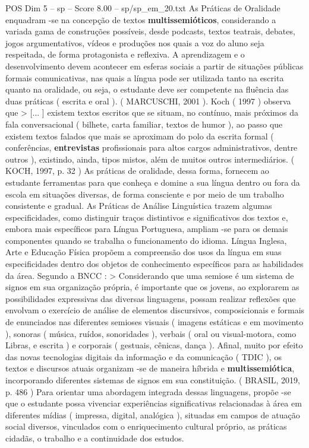 \begin{textsample}{POS Dim 5 – sp – Score 8.00 – sp/sp\_em\_20.txt}
As Práticas de Oralidade enquadram -se na concepção de textos \textbf{multissemióticos}, considerando a variada gama de construções possíveis, desde podcasts, textos teatrais, debates, jogos argumentativos, vídeos e produções nos quais a voz do aluno seja respeitada, de forma protagonista e reflexiva.
A aprendizagem e o desenvolvimento devem acontecer em esferas sociais a partir de situações públicas formais comunicativas, nas quais a língua pode ser utilizada tanto na escrita quanto na oralidade, ou seja, o estudante deve ser competente na fluência das duas práticas ( escrita e oral ). ( MARCUSCHI, 2001 ).
Koch ( 1997 ) observa que > [... ] existem textos escritos que se situam, no contínuo, mais próximos da fala conversacional ( bilhete, carta familiar, textos de humor ), ao passo que existem textos falados que mais se aproximam do polo da escrita formal ( conferências, \textbf{entrevistas} profissionais para altos cargos administrativos, dentre outros ), existindo, ainda, tipos mistos, além de muitos outros intermediários. ( KOCH, 1997, p. 32 ) As práticas de oralidade, dessa forma, fornecem ao estudante ferramentas para que conheça e domine a sua língua dentro ou fora da escola em situações diversas, de forma consciente e por meio de um trabalho consistente e gradual.
As Práticas de Análise Linguística trazem algumas especificidades, como distinguir traços distintivos e significativos dos textos e, embora mais específicos para Língua Portuguesa, ampliam -se para os demais componentes quando se trabalha o funcionamento do idioma.
Língua Inglesa, Arte e Educação Física propõem a compreensão dos usos da língua em suas especificidades dentro dos objetos de conhecimento específicos para as habilidades da área.
Segundo a BNCC : > Considerando que uma semiose é um sistema de signos em sua organização própria, é importante que os jovens, ao explorarem as possibilidades expressivas das diversas linguagens, possam realizar reflexões que envolvam o exercício de análise de elementos discursivos, composicionais e formais de enunciados nas diferentes semioses visuais ( imagens estáticas e em movimento ), sonoras ( música, ruídos, sonoridades ), verbais ( oral ou visual-motora, como Libras, e escrita ) e corporais ( gestuais, cênicas, dança ).
Afinal, muito por efeito das novas tecnologias digitais da informação e da comunicação ( TDIC ), os textos e discursos atuais organizam -se de maneira híbrida e \textbf{multissemiótica}, incorporando diferentes sistemas de signos em sua constituição. ( BRASIL, 2019, p. 486 ) Para orientar uma abordagem integrada dessas linguagens, propõe -se que o estudante possa vivenciar experiências significativas relacionadas à área em diferentes mídias ( impressa, digital, analógica ), situadas em campos de atuação social diversos, vinculados com o enriquecimento cultural próprio, as práticas cidadãs, o trabalho e a continuidade dos estudos.

\end{textsample}
